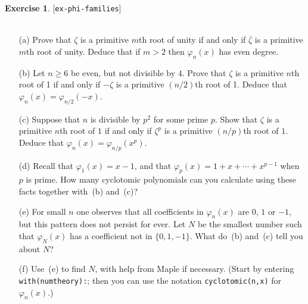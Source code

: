 \documentclass{amsart}
\newcommand{\zt}        {\zeta}
\newcommand{\vph}       {\varphi}
\newcommand{\ov}[1]     {\overline{#1}}
\renewcommand{\:}{\colon}
\newcommand{\lastexlabel}{}
\newcommand{\exlabel}[1]{
 \global\def\lastexlabel{#1}\label{#1}[\texttt{#1}]\ \\
}
\newcommand{\exlabel}[1]{
 \global\def\lastexlabel{#1}\label{#1}
}
\theoremstyle{definition}
\newtheorem{exercise}{Exercise}[section]
\begin{document}
\begin{exercise}\exlabel{ex-phi-families}\ \\
 \begin{itemize}
  \item[(a)] Prove that $\zt$ is a primitive $m$th root of unity if
   and only if $\ov{\zt}$ is a primitive $m$th root of unity.  Deduce
   that if $m>2$ then $\vph_n(x)$ has even degree.
  \item[(b)] Let $n\geq 6$ be even, but not divisible by $4$.  Prove
   that $\zt$ is a primitive $n$th root of 1 if and only if $-\zt$ is
   a primitive $(n/2)$th root of 1.  Deduce that
   $\vph_n(x)=\vph_{n/2}(-x)$. 
  \item[(c)] Suppose that $n$ is divisible by $p^2$ for some prime
   $p$.  Show that $\zt$ is a primitive $n$th root of $1$ if and only
   if $\zt^p$ is a primitive $(n/p)$th root of $1$.  Deduce that
   $\vph_n(x)=\vph_{n/p}(x^p)$.
  \item[(d)] Recall that $\vph_1(x)=x-1$, and that
   $\vph_p(x)=1+x+\dotsb+x^{p-1}$ when $p$ is prime.  How many
   cyclotomic polynomials can you calculate using these facts together
   with~(b) and~(c)?
  \item[(e)] For small $n$ one observes that all coefficients in
   $\vph_n(x)$ are $0$, $1$ or $-1$, but this pattern does not persist
   for ever.  Let $N$ be the smallest number such that $\vph_N(x)$ has
   a coefficient not in $\{0,1,-1\}$.  What do~(b) and~(c) tell you
   about $N$?
  \item[(f)] Use~(e) to find $N$, with help from Maple if
   necessary.  (Start by entering
   \verb+with(numtheory):+; then you can use the notation
   \verb+cyclotomic(n,x)+ for $\vph_n(x)$.) 
 \end{itemize}
\end{exercise}
\end{document}
